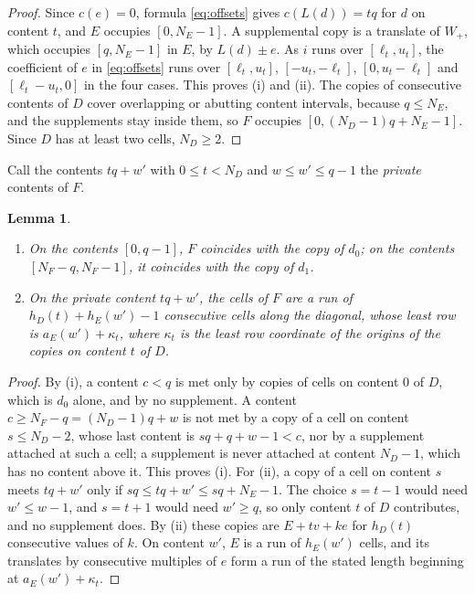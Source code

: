 \documentclass[11pt,a4paper]{amsart}
\numberwithin{equation}{section}
\theoremstyle{plain}
\newtheorem{lemma}[theorem]{Lemma}
\theoremstyle{definition}
\begin{document}
\begin{proof}
Since \(c(e)=0\), formula \eqref{eq:offsets} gives \(c(L(d))=tq\) for \(d\) on content \(t\), and \(E\) occupies \([0,N_E-1]\).  A supplemental copy is a translate of \(W_+\), which occupies \([q,N_E-1]\) in \(E\), by \(L(d)\pm e\).  As \(i\) runs over \([\ell_t,u_t]\), the coefficient of \(e\) in \eqref{eq:offsets} runs over \([\ell_t,u_t]\), \([-u_t,-\ell_t]\), \([0,u_t-\ell_t]\) and \([\ell_t-u_t,0]\) in the four cases.  This proves (i) and (ii).  The copies of consecutive contents of \(D\) cover overlapping or abutting content intervals, because \(q\le N_E\), and the supplements stay inside them, so \(F\) occupies \([0,(N_D-1)q+N_E-1]\).  Since \(D\) has at least two cells, \(N_D\ge2\).
\end{proof}

Call the contents \(tq+w'\) with \(0\le t<N_D\) and \(w\le w'\le q-1\) the \emph{private} contents of \(F\).

\begin{lemma}\label{lem:bands}
\begin{enumerate}
\item[(i)] On the contents \([0,q-1]\), \(F\) coincides with the copy of \(d_0\); on the contents \([N_F-q,N_F-1]\), it coincides with the copy of \(d_1\).
\item[(ii)] On the private content \(tq+w'\), the cells of \(F\) are a run of \(h_D(t)+h_E(w')-1\) consecutive cells along the diagonal, whose least row is \(a_E(w')+\kappa_t\), where \(\kappa_t\) is the least row coordinate of the origins of the copies on content \(t\) of \(D\).
\end{enumerate}
\end{lemma}

\begin{proof}
By (i), a content \(c<q\) is met only by copies of cells on content \(0\) of \(D\), which is \(d_0\) alone, and by no supplement.  A content \(c\ge N_F-q=(N_D-1)q+w\) is not met by a copy of a cell on content \(s\le N_D-2\), whose last content is \(sq+q+w-1<c\), nor by a supplement attached at such a cell; a supplement is never attached at content \(N_D-1\), which has no content above it.  This proves (i).  For (ii), a copy of a cell on content \(s\) meets \(tq+w'\) only if \(sq\le tq+w'\le sq+N_E-1\).  The choice \(s=t-1\) would need \(w'\le w-1\), and \(s=t+1\) would need \(w'\ge q\), so only content \(t\) of \(D\) contributes, and no supplement does.  By (ii) these copies are \(E+tv+ke\) for \(h_D(t)\) consecutive values of \(k\).  On content \(w'\), \(E\) is a run of \(h_E(w')\) cells, and its translates by consecutive multiples of \(e\) form a run of the stated length beginning at \(a_E(w')+\kappa_t\).
\end{proof}
\end{document}
